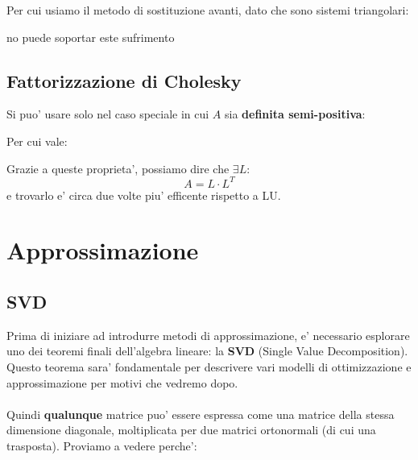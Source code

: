Per cui usiamo il metodo di sostituzione avanti, dato che sono sistemi triangolari:
\begin{center}
    no puede soportar este sufrimento
\end{center}
\subsection{Fattorizzazione di Cholesky}
Si puo' usare solo nel caso speciale in cui $ A $ sia \textbf{definita semi-positiva}:

Per cui vale:

Grazie a queste proprieta', possiamo dire che $ \exists L: $
\[
A = L \cdot L^T
\]
e trovarlo e' circa due volte piu' efficente rispetto a LU.

\section{Approssimazione}
\subsection{SVD}
Prima di iniziare ad introdurre metodi di approssimazione, e' necessario esplorare uno dei teoremi finali dell'algebra lineare: la \textbf{SVD} (Single Value Decomposition). Questo teorema sara' fondamentale per descrivere vari modelli di ottimizzazione e approssimazione per motivi che vedremo dopo.\\
\\
Quindi \textbf{qualunque} matrice puo' essere espressa come una matrice della stessa dimensione diagonale, moltiplicata per due matrici ortonormali (di cui una trasposta). Proviamo a vedere perche':
\pf{}{

}
